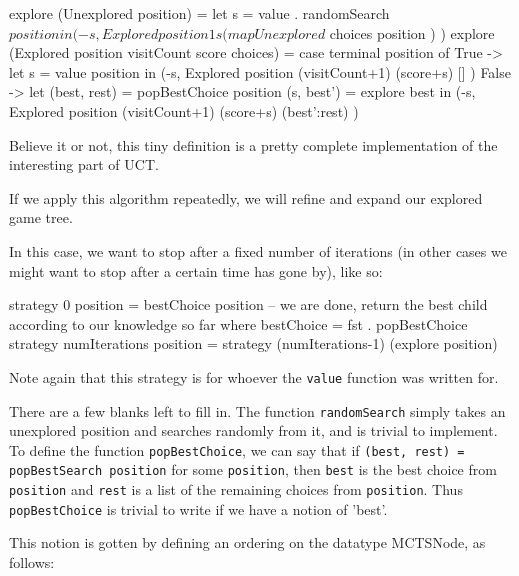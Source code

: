 \begin{code}

explore (Unexplored position) =
  let s = value . randomSearch $ position in
  (-s, Explored position 1 s (map Unexplored $ choices position ) )
explore (Explored position visitCount score choices) = 
  case terminal position of
    True -> let s = value position in (-s, Explored position (visitCount+1) (score+s) [] )
    False -> let (best, rest) = popBestChoice position
                 (s, best') = explore best in
                 (-s, Explored position (visitCount+1) (score+s) (best':rest) )

\end{code}


Believe it or not, this tiny definition is a pretty complete implementation of the interesting part of UCT.

If we apply this algorithm repeatedly, we will refine and expand our explored game tree.

In this case, we want to stop after a fixed number of iterations (in other cases we might want to stop after a certain time has gone by), like so:

\begin{code}
  strategy 0 position = 
    bestChoice position                              -- we are done, return the best child according to our knowledge so far
    where
    bestChoice = fst . popBestChoice
  strategy numIterations position  = 
    strategy (numIterations-1) (explore position)
\end{code}

Note again that this strategy is for whoever the \texttt{value} function was written for.

There are a few blanks left to fill in. The function \texttt{randomSearch} simply takes an unexplored position and searches randomly from it, and is trivial to implement.
To define the function \texttt{popBestChoice}, we can say that if \texttt{(best, rest) = popBestSearch position} for some \texttt{position}, then \texttt{best} is the best choice from \texttt{position} and \texttt{rest} is a list of the remaining choices from \texttt{position}.
Thus \texttt{popBestChoice} is trivial to write if we have a notion of 'best'.

This notion is gotten by defining an ordering on the datatype MCTSNode, as follows:



